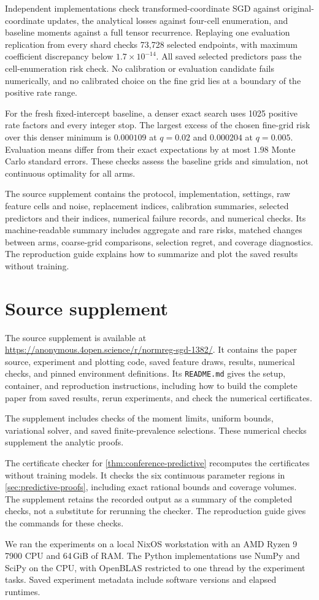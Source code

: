 \documentclass{alt2027}
\begin{document}
Independent implementations check transformed-coordinate SGD against
original-coordinate updates, the analytical losses against four-cell
enumeration, and baseline moments against a full tensor recurrence. Replaying
one evaluation replication from every shard checks 73,728 selected endpoints,
with maximum coefficient discrepancy below $1.7 \times 10^{-14}$. All saved
selected predictors pass the cell-enumeration risk check. No calibration or
evaluation candidate fails numerically, and no calibrated choice on the fine
grid lies at a boundary of the positive rate range.

For the fresh fixed-intercept baseline, a denser exact search uses 1025 positive
rate factors and every integer stop. The largest excess of the chosen fine-grid
risk over this denser minimum is $0.000109$ at $q = 0.02$ and $0.000204$ at
$q = 0.005$. Evaluation means differ from their exact expectations by at most
$1.98$ Monte Carlo standard errors. These checks assess the baseline grids and
simulation, not continuous optimality for all arms.

The source supplement contains the protocol, implementation, settings, raw
feature cells and noise, replacement indices, calibration summaries, selected
predictors and their indices, numerical failure records, and numerical checks.
Its machine-readable summary includes aggregate and rare risks, matched changes
between arms, coarse-grid comparisons, selection regret, and coverage
diagnostics. The reproduction guide explains how to summarize and plot the saved
results without training.

\section{Source supplement}
\label{sec:reproducibility}

The source supplement is available at
\url{https://anonymous.4open.science/r/normreg-sgd-1382/}. It contains the paper
source, experiment and plotting code, saved feature draws, results, numerical
checks, and pinned environment definitions. Its \texttt{README.md} gives the
setup, container, and reproduction instructions, including how to build the
complete paper from saved results, rerun experiments, and check the numerical
certificates.

The supplement includes checks of the moment limits, uniform bounds, variational
solver, and saved finite-prevalence selections. These numerical checks
supplement the analytic proofs.

The certificate checker for \cref{thm:conference-predictive} recomputes the
certificates without training models. It checks the six continuous parameter
regions in \cref{sec:predictive-proofs}, including exact rational bounds and
coverage volumes. The supplement retains the recorded output as a summary of the
completed checks, not a substitute for rerunning the checker. The reproduction
guide gives the commands for these checks.

We ran the experiments on a local NixOS workstation with an AMD Ryzen 9 7900 CPU
and 64\,GiB of RAM\@. The Python implementations use NumPy and SciPy on the CPU,
with OpenBLAS restricted to one thread by the experiment tasks. Saved experiment
metadata include software versions and elapsed runtimes.
\end{document}

